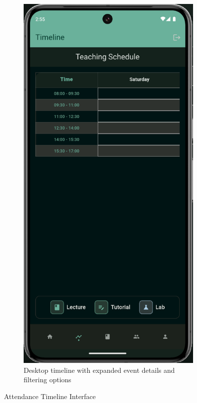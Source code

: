 \begin{figure}[H]
\begin{subfigure}[b]{0.48\textwidth}
        \includegraphics[width=\textwidth]{images/rachid/teacher-side-timeline-desktop.png}
        \caption{Desktop timeline with expanded event details and filtering options}
    \end{subfigure}
    \caption{Attendance Timeline Interface}
    \label{fig:timeline-interface}
\end{figure}
